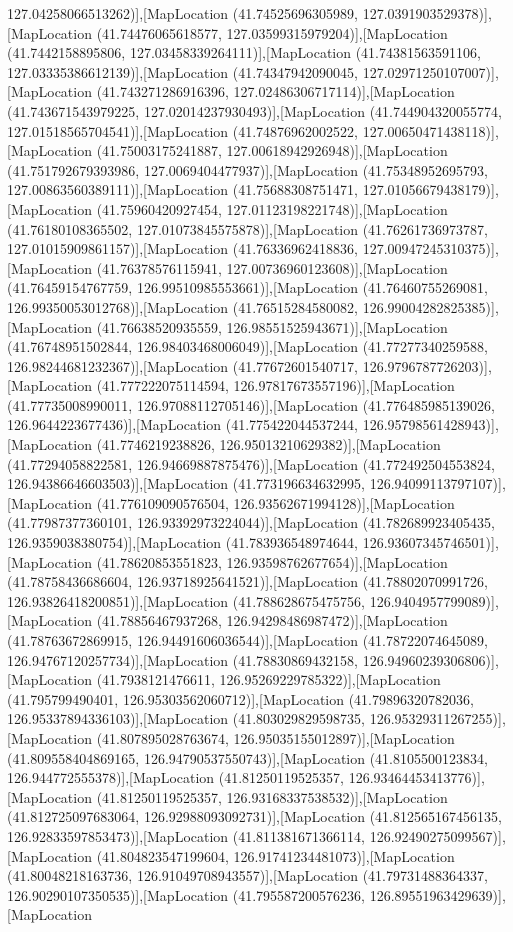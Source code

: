 127.04258066513262)],[MapLocation (41.74525696305989, 127.0391903529378)],[MapLocation (41.74476065618577, 127.03599315979204)],[MapLocation (41.7442158895806, 127.03458339264111)],[MapLocation (41.74381563591106, 127.03335386612139)],[MapLocation (41.74347942090045, 127.02971250107007)],[MapLocation (41.743271286916396, 127.02486306717114)],[MapLocation (41.743671543979225, 127.02014237930493)],[MapLocation (41.744904320055774, 127.01518565704541)],[MapLocation (41.74876962002522, 127.00650471438118)],[MapLocation (41.75003175241887, 127.00618942926948)],[MapLocation (41.751792679393986, 127.0069404477937)],[MapLocation (41.75348952695793, 127.00863560389111)],[MapLocation (41.75688308751471, 127.01056679438179)],[MapLocation (41.75960420927454, 127.01123198221748)],[MapLocation (41.76180108365502, 127.01073845575878)],[MapLocation (41.76261736973787, 127.01015909861157)],[MapLocation (41.76336962418836, 127.00947245310375)],[MapLocation (41.76378576115941, 127.00736960123608)],[MapLocation (41.76459154767759, 126.99510985553661)],[MapLocation (41.76460755269081, 126.99350053012768)],[MapLocation (41.76515284580082, 126.99004282825385)],[MapLocation (41.76638520935559, 126.98551525943671)],[MapLocation (41.76748951502844, 126.98403468006049)],[MapLocation (41.77277340259588, 126.98244681232367)],[MapLocation (41.77672601540717, 126.9796787726203)],[MapLocation (41.777222075114594, 126.97817673557196)],[MapLocation (41.77735008990011, 126.97088112705146)],[MapLocation (41.776485985139026, 126.9644223677436)],[MapLocation (41.775422044537244, 126.95798561428943)],[MapLocation (41.7746219238826, 126.95013210629382)],[MapLocation (41.77294058822581, 126.94669887875476)],[MapLocation (41.772492504553824, 126.94386646603503)],[MapLocation (41.773196634632995, 126.94099113797107)],[MapLocation (41.776109090576504, 126.93562671994128)],[MapLocation (41.77987377360101, 126.93392973224044)],[MapLocation (41.782689923405435, 126.9359038380754)],[MapLocation (41.783936548974644, 126.93607345746501)],[MapLocation (41.78620853551823, 126.93598762677654)],[MapLocation (41.78758436686604, 126.93718925641521)],[MapLocation (41.78802070991726, 126.93826418200851)],[MapLocation (41.788628675475756, 126.9404957799089)],[MapLocation (41.78856467937268, 126.94298486987472)],[MapLocation (41.78763672869915, 126.94491606036544)],[MapLocation (41.78722074645089, 126.94767120257734)],[MapLocation (41.78830869432158, 126.94960239306806)],[MapLocation (41.7938121476611, 126.95269229785322)],[MapLocation (41.795799490401, 126.95303562060712)],[MapLocation (41.79896320782036, 126.95337894336103)],[MapLocation (41.803029829598735, 126.95329311267255)],[MapLocation (41.807895028763674, 126.95035155012897)],[MapLocation (41.809558404869165, 126.94790537550743)],[MapLocation (41.8105500123834, 126.944772555378)],[MapLocation (41.81250119525357, 126.93464453413776)],[MapLocation (41.81250119525357, 126.93168337538532)],[MapLocation (41.812725097683064, 126.92988093092731)],[MapLocation (41.812565167456135, 126.92833597853473)],[MapLocation (41.811381671366114, 126.92490275099567)],[MapLocation (41.804823547199604, 126.91741234481073)],[MapLocation (41.80048218163736, 126.91049708943557)],[MapLocation (41.79731488364337, 126.90290107350535)],[MapLocation (41.795587200576236, 126.89551963429639)],[MapLocation 